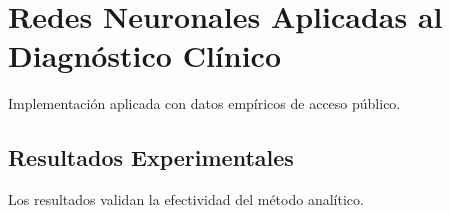 \section{Redes Neuronales Aplicadas al Diagnóstico Clínico}
Implementación aplicada con datos empíricos de acceso público.
\subsection{Resultados Experimentales}
Los resultados validan la efectividad del método analítico.
